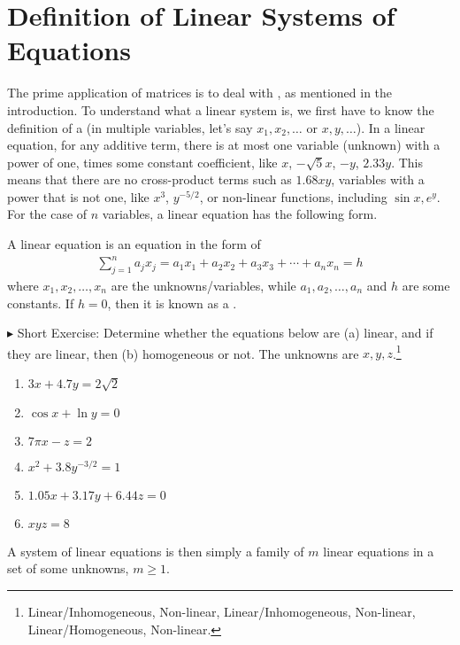 \section{Definition of Linear Systems of Equations}
\label{section:deflinsys}
The prime application of matrices is to deal with , as mentioned in the introduction. To understand what a linear system is, we first have to know the definition of a  (in multiple variables, let's say $x_1, x_2, \ldots$ or $x, y, \ldots$). In a linear equation, for any additive term, there is at most one variable (unknown) with a power of one, times some constant coefficient, like $x$, $-\sqrt{5}x$, $-y$, $2.33y$. This means that there are no cross-product terms such as $1.68xy$, variables with a power that is not one, like $x^3$, $y^{-5/2}$, or non-linear functions, including $\sin{x}, e^{y}$. For the case of $n$ variables, a linear equation has the following form.
\begin{defn}
A linear equation is an equation in the form of
\begin{align}
\sum_{j=1}^n a_jx_j = a_1x_1 + a_2x_2 + a_3x_3 + \cdots + a_nx_n = h
\end{align}
where $x_1, x_2, \ldots, x_n$ are the unknowns/variables, while $a_1, a_2, \ldots, a_n$ and $h$ are some constants. If $h = 0$, then it is known as a .
\end{defn}
$\blacktriangleright$ Short Exercise: Determine whether the equations below are (a) linear, and if they are linear, then (b) homogeneous or not. The unknowns are $x, y, z$.\footnote{Linear/Inhomogeneous, Non-linear, Linear/Inhomogeneous, Non-linear, Linear/Homogeneous, Non-linear.}
\begin{enumerate}
    \item $3x + 4.7y = 2\sqrt{2}$ 
    \item $\cos x + \ln y = 0$
    \item $7\pi x - z = 2$ 
    \item $x^2 + 3.8y^{-3/2} = 1$
    \item $1.05x + 3.17y + 6.44z = 0$
    \item $xyz = 8$ 
\end{enumerate}
A system of linear equations is then simply a family of $m$ linear equations in a set of some unknowns, $m \geq 1$.
